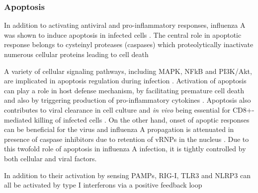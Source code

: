 		\subsubsection{Apoptosis}
		
		In addition to activating antiviral and pro-inflammatory responses, influenza A was shown to induce apoptosis in infected cells \parencite{Fesq1994, Hinshaw1994, Mori1995, Brydon2005}. The central role in apoptotic response belongs to cysteinyl proteases (caspases) which proteolytically inactivate numerous cellular proteins leading to cell death \parencite{Cohen1997, Thornberry1998}	
		
		A variety of cellular signaling pathways, including \gls{MAPK}, \gls{NFkB} and \gls{PI3K}/Akt, are implicated in apoptosis regulation during infection \parencite{Xing2010, Lu2010}. Activation of apoptosis can play a role in host defense mechanism, by facilitating premature cell death and also by triggering production of pro-inflammatory cytokines \parencite{Julkunen2000}. Apoptosis also contributes to viral clearance in cell culture and \textit{in vivo} being essential for CD8+-mediated killing of infected cells \parencite{Ishikawa2005, Brincks2008}. On the other hand, onset of apoptic responses can be beneficial for the virus and influenza A propagation is attenuated in presence of caspase inhibitors due to retention of vRNPs in the nucleus \parencite{Wurzer2003}. Due to this twofold role of apoptosis in influenza A infection, it is tightly controlled by both cellular and viral factors.
		
		In addition to their activation by sensing \gls{PAMP}s, \gls{RIG-I}, \gls{TLR}3 and \gls{NLRP3} can all be activated by type I interferons via a positive feedback loop \parencite{Pothlichet2013}
				
		
		
